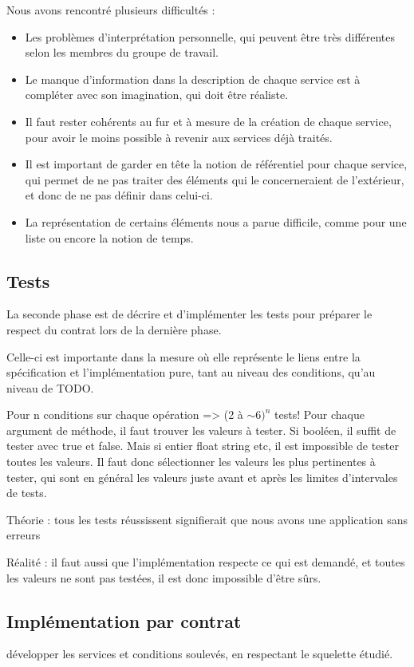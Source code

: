 \documentclass[a4paper, 11pt, notitlepage]{article}
\begin{document}
Nous avons rencontré plusieurs difficultés :
\begin{itemize}
\item Les problèmes d’interprétation personnelle, qui peuvent être
  très différentes selon les membres du groupe de travail.
\item Le manque d'information dans la description de chaque service
  est à compléter avec son imagination, qui doit être réaliste.
\item Il faut rester cohérents au fur et à mesure de la création de
  chaque service, pour avoir le moins possible à revenir aux services
  déjà traités. 
\item Il est important de garder en tête la notion de référentiel pour
  chaque service, qui permet de ne pas traiter des éléments qui
  le concerneraient de l'extérieur, et donc de ne pas définir dans celui-ci.

\item La représentation de certains éléments nous a parue difficile,
  comme pour une liste ou encore la notion de temps.
\end{itemize}

\subsection{Tests}
La seconde phase est de décrire et d'implémenter les tests pour préparer
le respect du contrat lors de la dernière phase.

Celle-ci est importante dans la mesure où elle représente le liens
entre la spécification et l'implémentation pure, tant au niveau des
conditions, qu'au niveau de TODO.

Pour n conditions sur chaque opération => (2 à $\sim 6)^n$ tests!
Pour chaque argument de méthode, il faut trouver les valeurs à tester.
Si booléen, il suffit de tester avec true et false.
Mais si entier float string etc, il est impossible de tester toutes
les valeurs. Il faut donc sélectionner les valeurs les plus
pertinentes à tester, qui sont en général les valeurs juste avant et
après les limites d'intervales de tests.

Théorie : tous les tests réussissent signifierait que nous avons une application sans erreurs

Réalité : il faut aussi que l’implémentation respecte ce qui est
demandé, et toutes les valeurs ne sont pas testées, il est donc
impossible d'être sûrs.


\subsection{Implémentation par contrat}
développer les services et conditions soulevés, en respectant le
squelette étudié.
\end{document}
